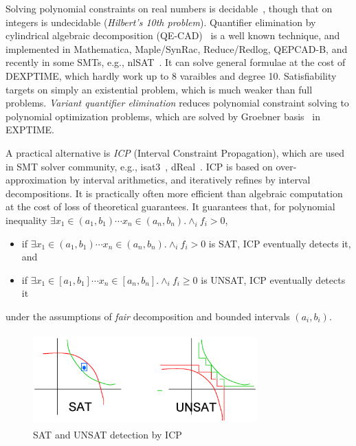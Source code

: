 \documentclass[runningheads,a4paper,oribibl]{llncs}
\begin{document}
Solving polynomial constraints on real numbers is decidable~\cite{tarski}, 
though that on integers is undecidable ({\em Hilbert's 10th problem}). 
Quantifier elimination by cylindrical algebraic decomposition (QE-CAD)~\cite{qecad} 
is a well known technique, and 
implemented in Mathematica, Maple/SynRac, Reduce/Redlog, QEPCAD-B, and recently 
in some SMTs, e.g., nlSAT~\cite{Jovanovic13}. 
It can solve general formulae at the cost of DEXPTIME, which hardly work up to 8 varaibles and degree 10.
Satisfiability targets on simply an existential problem, which is much weaker than full problems. 
{\em Variant quantifier elimination} reduces polynomial constraint solving to 
polynomial optimization problems, which are solved by Groebner basis~\cite{MohabJSC12} in EXPTIME. 

A practical alternative is {\em ICP} (Interval Constraint Propagation), 
which are used in SMT solver community, e.g., isat3~\cite{isat}, dReal~\cite{dRealCADE13}.
ICP is based on over-approximation by interval arithmetics, and iteratively refines by
interval decompositions. 
It is practically often more efficient than algebraic computation 
at the cost of loss of theoretical guarantees. 
It guarantees that, for polynomial inequality 
$\exists x_1 \in (a_1,b_1) \cdots x_n \in (a_n,b_n) . \wedge_{i} f_i > 0$, 
\begin{itemize}
\item if $\exists x_1 \in (a_1,b_1) \cdots x_n \in (a_n,b_n) . \wedge_{i} f_i > 0$ is SAT, 
ICP eventually detects it, and 
\item if $\exists x_1 \in [a_1,b_1] \cdots x_n \in [a_n,b_n] . \wedge_{i} f_i \geq 0$ is UNSAT, 
ICP eventually detects it
\end{itemize}
under the assumptions of {\em fair} decomposition and bounded intervals $(a_i,b_i)$. 

\begin{figure}[ht]
\centering
\includegraphics[height=1.4in,width=3.4in]{FigCompleteness.eps} 
\caption{SAT and UNSAT detection by ICP} 
\label{fig:complete} 
\end{figure} 
\end{document}
